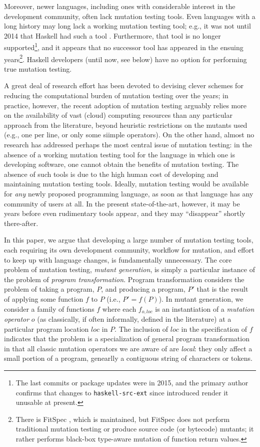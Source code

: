 \documentclass[sigconf,review, anonymous]{acmart}
\begin{document}
Moreover, newer languages, including ones with considerable interest
in the development community, often lack mutation testing tools.  Even
languages with a long history may long lack a working mutation testing
tool; e.g., it was not until 2014 that Haskell had such a tool
\cite{mucheck}.  Furthermore, that tool is no longer
supported\footnote{The last commits or package updates were in 2015, and the
primary author confirms that changes to {\tt haskell-src-ext} since
introduced render it unusable at present.}, and it
appears that no successor tool has appeared in the ensuing
years\footnote{There is FitSpec \cite{FitSpec}, which is maintained,
  but FitSpec does not perform traditional mutation testing or produce
  source code (or bytecode) mutants; it rather
  performs black-box type-aware mutation of function return values.}.
Haskell developers (until now, see below) have no option for
performing true mutation testing.

A great deal of research effort has been devoted to devising clever
schemes for reducing the computational burden of mutation testing over
the years; in practice, however, the recent adoption of mutation
testing arguably relies more on the availability of vast (cloud) computing
resources than any particular approach from the literature, beyond
heuristic restrictions on the mutants used (e.g., one per line, or
only some siimple operators).   On the other hand, almost no
research has addressed perhaps the most central issue of
mutation testing: in the absence of a working mutation testing
tool for the language in which one is developing software, one cannot
obtain the benefits of mutation testing.  The absence of such tools is
due to the high human cost of developing and maintaining mutation
testing tools.  Ideally, mutation testing would be available for
\emph{any} newly proposed programming language, as soon as that
language has any community of users at all.  In the present
state-of-the-art, however, it may be years before even rudimentary
tools appear, and they may ``disappear'' shortly there-after.

In this paper, we argue that developing a large number of mutation
testing tools, each requiring its own development community, workflow
for mutation, and effort to keep up with language changes, is fundamentally
unnecessary.  The core problem of mutation testing,
\emph{mutant generation}, is simply a particular instance of the
problem of \emph{program transformation}.  Program transformation
considers the problem of taking a program, $P$, and producing a
program, $P'$ that is the result of applying some function $f$ to $P$
(i.e., $P' = f(P)$).  In mutant generation, we
consider a family of functions $f$ where each $f_{o,loc}$ is an
instantiation of a \emph{mutation operator} $o$  (as classically, if
often informally, defined in the literature) at a particular program
location $loc$ in $P$.  The inclusion of $loc$ in the specification of
$f$ indicates that the problem is a specialization of general
program transformation in that all classic mutation operators we are
aware of are \emph{local}: they only affect a small portion of a
program, genearlly a contiguous string of characters or tokens.
\end{document}
